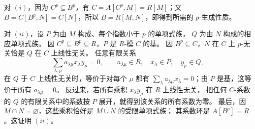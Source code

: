\eproof
对 $(i)$，因为 $C^p\subseteq B^p$，有
$C=A[C^p,M]=R[M]$；又 $B=C[B^p,N]=C[N]$，所以
$B=R[M,N]$，即得到所需的 $p$-生成性质。

对 $(ii)$，设 $P$ 为由 $M$ 构成、每个指数小于 $p$ 的单项式族，
$Q$ 为由 $N$ 构成的相应单项式族。
因 $C^p\subseteq B^p\subseteq R$，$P$ 是 $R$-模 $C$ 的基。
因 $B^p\subseteq C$，$N$ 在 $C$ 上 $p$-无关恰是 $Q$ 在 $C$ 上线性无关。
任意有限关系
\[
 \sum_{\lambda,\mu}a_{\lambda\mu}x_\lambda y_\mu=0,
 \qquad a_{\lambda\mu}\in R,\quad x_\lambda\in P,\quad y_\mu\in Q,
\]
在 $Q$ 于 $C$ 上线性无关时，等价于对每个 $\mu$ 都有
$\sum_\lambda a_{\lambda\mu}x_\lambda=0$；由 $P$ 是基，这等价于所有 $a_{\lambda\mu}=0$。
反过来，若所有乘积 $x_\lambda y_\mu$ 在 $R$ 上线性无关，
把任何 $C$-系数的 $Q$ 的有限关系中的系数按 $P$ 展开，就得到该关系的所有系数为零。
最后，因 $M\cap N=\varnothing$，这些乘积恰好是 $M\cup N$ 的受限单项式族；
其系数环是 $A[B^p]=R$。这证明 $(ii)$。
\finishproof
